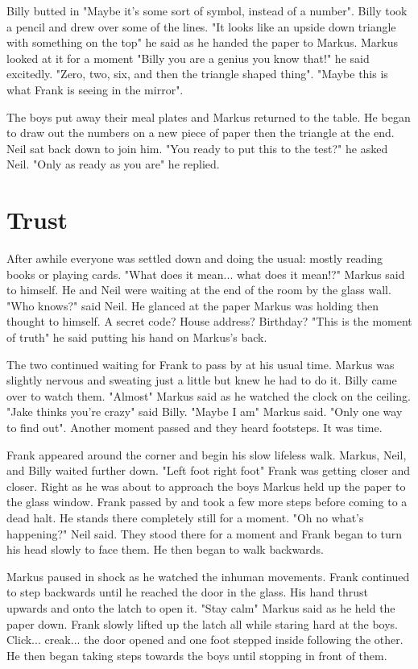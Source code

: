\documentclass[12pt]{book}
\begin{document}
Billy butted in "Maybe it's some sort of symbol, instead of a number". Billy took a pencil and drew over some of the lines. "It looks like an upside down triangle with something on the top" he said as he handed the paper to Markus. Markus looked at it for a moment "Billy you are a genius you know that!" he said excitedly. "Zero, two, six, and then the triangle shaped thing". "Maybe this is what Frank is seeing in the mirror".

The boys put away their meal plates and Markus returned to the table. He began to draw out the numbers on a new piece of paper then the triangle at the end. Neil sat back down to join him. "You ready to put this to the test?" he asked Neil. "Only as ready as you are" he replied.

\chapter{Trust}

After awhile everyone was settled down and doing the usual: mostly reading books or playing cards. "What does it mean... what does it mean!?" Markus said to himself. He and Neil were waiting at the end of the room by the glass wall. "Who knows?" said Neil. He glanced at the paper Markus was holding then thought to himself. A secret code? House address? Birthday? "This is the moment of truth" he said putting his hand on Markus's back.

The two continued waiting for Frank to pass by at his usual time. Markus was slightly nervous and sweating just a little but knew he had to do it. Billy came over to watch them. "Almost" Markus said as he watched the clock on the ceiling. "Jake thinks you're crazy" said Billy. "Maybe I am" Markus said. "Only one way to find out". Another moment passed and they heard footsteps. It was time.

Frank appeared around the corner and begin his slow lifeless walk. Markus, Neil, and Billy waited further down. "Left foot right foot" Frank was getting closer and closer. Right as he was about to approach the boys Markus held up the paper to the glass window. Frank passed by and took a few more steps before coming to a dead halt. He stands there completely still for a moment. "Oh no what's happening?" Neil said. They stood there for a moment and Frank began to turn his head slowly to face them. He then began to walk backwards.

Markus paused in shock as he watched the inhuman movements. Frank continued to step backwards until he reached the door in the glass. His hand thrust upwards and onto the latch to open it. "Stay calm" Markus said as he held the paper down. Frank slowly lifted up the latch all while staring hard at the boys. Click... creak... the door opened and one foot stepped inside following the other. He then began taking steps towards the boys until stopping in front of them.
\end{document}
